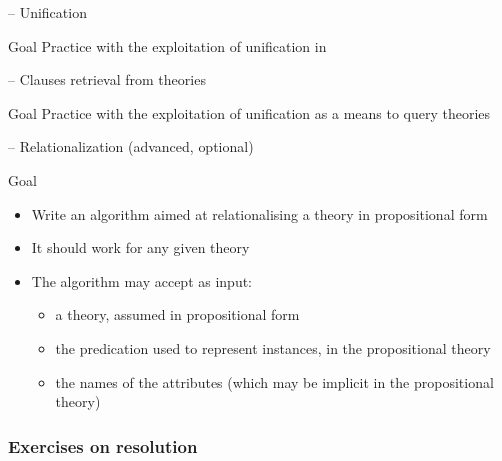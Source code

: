 \documentclass[presentation]{beamer}\mode<presentation>{\usetheme{AMSBolognaFC}}
\begin{document}
\begin{frame}{\currentExercise{} -- Unification}
    \label{slide:ex-uni}
    \begin{block}{Goal}
        Practice with the exploitation of unification in \twopkt{}
    \end{block}
\end{frame}

\startExercise{}

\begin{frame}{\currentExercise{} -- Clauses retrieval from theories}
    \begin{block}{Goal}
        Practice with the exploitation of unification as a means to query theories
    \end{block}
\end{frame}

\startExercise{}

\begin{frame}{\currentExercise{} -- Relationalization \hfill (advanced, \alert{optional})}
    \begin{block}{Goal}
        \begin{itemize}
            \item Write an algorithm aimed at relationalising a theory in propositional form
            
            \item It should work \alert{for any given theory}
            
            \item The algorithm may accept as input:
            \begin{itemize}
                \item a theory, assumed in propositional form
                \item the predication used to represent instances, in the propositional theory
                \item the names of the attributes (which may be implicit in the propositional theory)
            \end{itemize}
        \end{itemize}
    \end{block}
\end{frame}

\subsubsection{Exercises on resolution}

\startExercise{}
\end{document}
